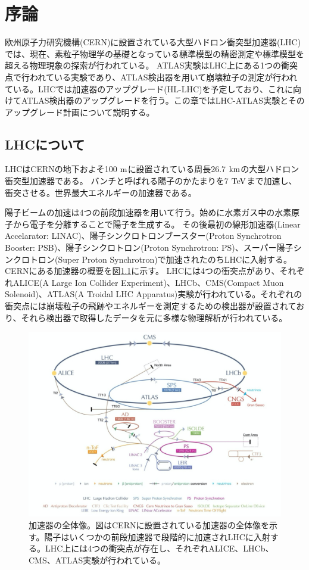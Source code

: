 \chapter{序論}
欧州原子力研究機構(CERN)に設置されている大型ハドロン衝突型加速器(LHC)では、現在、素粒子物理学の基礎となっている標準模型の精密測定や標準模型を超える物理現象の探索が行われている。
ATLAS実験はLHC上にある1つの衝突点で行われている実験であり、ATLAS検出器を用いて崩壊粒子の測定が行われている。LHCでは加速器のアップグレード(HL-LHC)を予定しており、これに向けてATLAS検出器のアップグレードを行う。この章ではLHC-ATLAS実験とそのアップグレード計画について説明する。

\section{LHCについて}
LHCはCERNの地下およそ100 $\rm{m}$に設置されている周長26.7 $\rm{km}$の大型ハドロン衝突型加速器である。
バンチと呼ばれる陽子のかたまりを7 $\rm{TeV}$まで加速し、衝突させる。世界最大エネルギーの加速器である。

陽子ビームの加速は4つの前段加速器を用いて行う。始めに水素ガス中の水素原子から電子を分離することで陽子を生成する。
その後最初の線形加速器(Linear Accelarator: LINAC)、陽子シンクロトロンブースター(Proton Synchrotron Booster: PSB)、陽子シンクロトロン(Proton Synchrotron: PS)、スーパー陽子シンクロトロン(Super Proton Synchrotron)で加速されたのちLHCに入射する。CERNにある加速器の概要を図\ref{LHC_overview}に示す。
LHCには4つの衝突点があり、それぞれALICE(A Large Ion Collider Experiment)、LHCb、CMS(Compact Muon Solenoid)、ATLAS(A
Troidal LHC Apparatus)実験が行われている。それぞれの衝突点には崩壊粒子の飛跡やエネルギーを測定するための検出器が設置されており、それら検出器で取得したデータを元に多様な物理解析が行われている。

\begin{figure}[bpt]\centering
\includegraphics[width=12cm]{LHC_overview}
\caption[加速器の全体像]{加速器の全体像\cite{1-1}。図はCERNに設置されている加速器の全体像を示す。陽子はいくつかの前段加速器で段階的に加速されLHCに入射する。LHC上には4つの衝突点が存在し、それぞれALICE、LHCb、CMS、ATLAS実験が行われている。}
\label{LHC_overview}
\end{figure}

